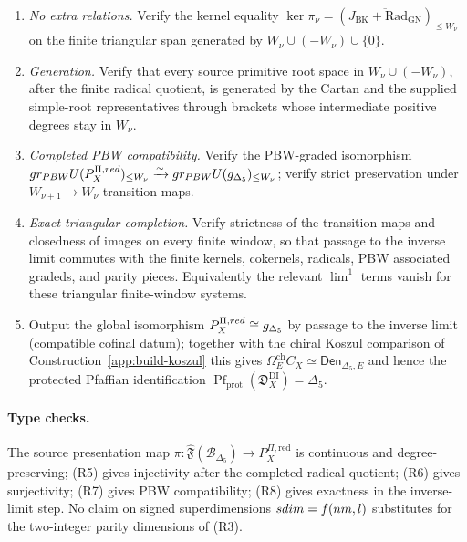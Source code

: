 \begin{enumerate}
\item[\textup{(R5)}] \emph{No extra relations.}  Verify the kernel
equality
\(\ker\pi_\nu=(\overline{J_{\mathrm{BK}}+\mathrm{Rad}_{\mathrm{GN}}})_{\le W_\nu}\) on the finite triangular span generated by
\(W_\nu\cup(-W_\nu)\cup\{0\}\).

\item[\textup{(R6)}] \emph{Generation.}  Verify that every source
primitive root space in \(W_\nu\cup(-W_\nu)\), after the finite
radical quotient, is generated by the Cartan and the supplied
simple-root representatives through brackets whose intermediate
positive degrees stay in \(W_\nu\).

\item[\textup{(R7)}] \emph{Completed PBW compatibility.}  Verify the
PBW-graded isomorphism
\(gr_{PBW}U(P_X^{\Pi,red})_{\le W_\nu}
\xrightarrow{\sim}
gr_{PBW}U(g_{\Delta_5})_{\le W_\nu}\); verify
strict preservation under \(W_{\nu+1}\to W_\nu\) transition maps.

\item[\textup{(R8)}] \emph{Exact triangular completion.}  Verify
strictness of the transition maps and closedness of images on every
finite window, so that passage to the inverse limit commutes with the
finite kernels, cokernels, radicals, PBW associated gradeds, and
parity pieces.  Equivalently the relevant \(\lim^1\) terms vanish for
these triangular finite-window systems.

\item Output the global isomorphism
\(P_X^{\Pi,red}\cong g_{\Delta_5}\) by passage to the inverse
limit (compatible cofinal datum); together with the chiral Koszul
comparison of Construction~\ref{app:build-koszul} this gives
\(\Omega_E^{\mathrm{ch}}C_X\simeq\mathsf{Den}_{\Delta_5,E}\) and hence
the protected Pfaffian identification
\(\operatorname{Pf}_{\mathrm{prot}}(\mathfrak D_X^{\mathrm{DI}})=\Delta_5\).
\end{enumerate}

\paragraph{Type checks.}
The source presentation map \(\pi:\widehat{\mathfrak F}(\mathscr B_{\Delta_5})\to P_X^{\Pi,\mathrm{red}}\) is
continuous and degree-preserving; \textup{(R5)} gives injectivity
after the completed radical quotient; \textup{(R6)} gives
surjectivity; \textup{(R7)} gives PBW compatibility; \textup{(R8)}
gives exactness in the inverse-limit step.  No claim on signed
superdimensions \(sdim=f(nm,l)\) substitutes for the two-integer
parity dimensions of \textup{(R3)}.

